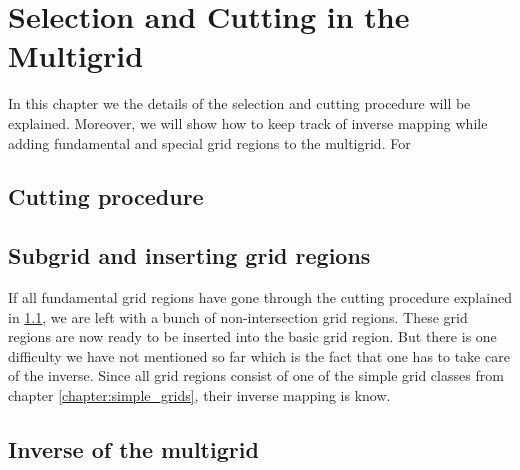 \chapter{Selection and Cutting in the Multigrid} \label{chapter:multigrid_selection_and_cutting}
In this chapter we the details of the selection and cutting procedure will be explained. Moreover, we will show how to keep track of inverse mapping while adding fundamental and special grid regions to the multigrid. For 
\section{Cutting procedure}\label{sec:cutting_procedure}

\section{Subgrid and inserting grid regions}\label{sec:subgrids_and_insert}
If all fundamental grid regions have gone through the cutting procedure explained in \ref{sec:cutting_procedure}, we are left with a bunch of non-intersection grid regions. These grid regions are now ready to be inserted into the basic grid region. But there is one difficulty we have not mentioned so far which is the fact that one has to take care of the inverse. Since all grid regions consist of one of the simple grid classes from chapter \ref{chapter:simple_grids}, their inverse mapping is know.

\section{Inverse of the multigrid}\label{sec:inverse_of_the_multigrid}



